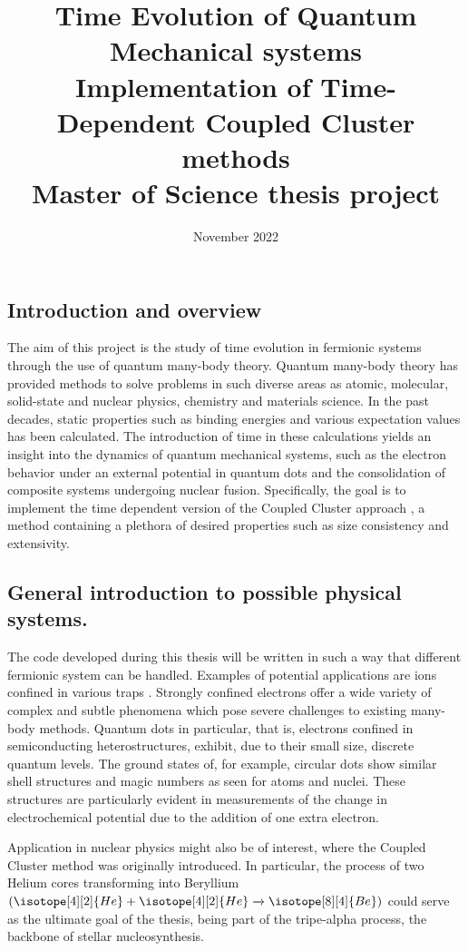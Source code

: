 \documentclass{article}
\title{Time Evolution of Quantum Mechanical systems \\ \vspace{5px} \large Implementation of Time-Dependent Coupled Cluster methods \\ \vspace{20px} \large Master of Science thesis project}
\date{November 2022}
\begin{document}
\maketitle

\subsection*{Introduction and overview}

The aim of this project is the study of time evolution in fermionic
systems through the use of quantum many-body theory. Quantum many-body
theory has provided methods to solve problems in such diverse areas as
atomic, molecular, solid-state and nuclear physics, chemistry and
materials science. In the past decades, static properties such as
binding energies and various expectation values has been
calculated. The introduction of time in these calculations yields an
insight into the dynamics of quantum mechanical systems, such as the
electron behavior under an external potential in quantum dots and the
consolidation of composite systems undergoing nuclear
fusion. Specifically, the goal is to implement the time dependent
version of the Coupled Cluster approach
\autocite{doi:10.1063/1.4718427}, a method containing a plethora of
desired properties such as size consistency and extensivity.

\subsection*{General introduction to possible physical systems.}

The code developed during this thesis will be written in such a way
that different fermionic system can be handled. Examples of potential
applications are ions confined in various traps
\autocite{RevModPhys.72.895}. Strongly confined electrons offer a wide
variety of complex and subtle phenomena which pose severe challenges
to existing many-body methods. Quantum dots in particular, that is,
electrons confined in semiconducting heterostructures, exhibit, due to
their small size, discrete quantum levels. The ground states of, for
example, circular dots show similar shell structures and magic numbers
as seen for atoms and nuclei. These structures are particularly
evident in measurements of the change in electrochemical potential due
to the addition of one extra electron.

Application in nuclear physics might also be of
interest\autocite{Pigg_2012}, where the Coupled Cluster method was
originally introduced. In particular, the process of two Helium cores
transforming into Beryllium $(\isotope[4][2]{He} + \isotope[4][2]{He}
\xrightarrow{} \isotope[8][4]{Be})$ could serve as the ultimate goal
of the thesis, being part of the tripe-alpha process, the backbone of
stellar nucleosynthesis.
\end{document}
